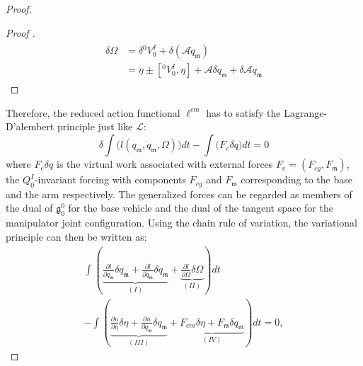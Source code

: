 \documentclass[lettersize,journal]{IEEEtran}
\def \g  {\mathfrak{g}}
\def \m  {\mathfrak{m}}
\def \L {\mathcal{L}}
\def \A {\mathcal{A}}
\theoremstyle{remark}
\begin{document}
\begin{proof}[Proof]
\begin{proof}[Proof ]
\begin{align}
\begin{split}
    \delta \Omega &= \delta {}^0V^I_0+ \delta (\A\dot{q}_\mathfrak{m})\\
    &= \dot{\eta}\pm [{}^0V^I_0,\eta] + \A\delta \dot{q}_\mathfrak{m}+\delta \A\dot{q}_\mathfrak{m}
    \end{split}
\end{align}
\end{proof}
Therefore, the reduced action functional $\ell^{cm}$ has to satisfy the Lagrange-D'alembert principle just like $\L$:
\begin{equation}
    \delta \int \Big(l(q_\mathfrak{m},\dot{q}_\mathfrak{m},\Omega)\Big)dt- \int \Big( F_e\delta q \Big) dt=0
\end{equation}
where $F_e\delta q$ is the virtual work associated with external forces $F_e=(F_{cg},F_\mathfrak{m})$, the $Q^I_0$-invariant forcing with components $F_{cg}$ and $F_\mathfrak{m}$ corresponding to the base and the arm respectively. The generalized forces can be regarded as members of the dual of $\g^0_0$ for the base vehicle and the dual of the tangent space for the manipulator joint configuration.%
Using the chain rule of variation, the variational principle can then be written as:
\begin{multline}
    \int (\underbrace{\frac{\partial l}{\partial q_\mathfrak{m}} \delta q_\mathfrak{m} +\frac{\partial l}{\partial\dot{q}_\mathfrak{m}} \delta \dot{q}_\mathfrak{m}}_{(I)} +\underbrace{\frac{\partial l}{\partial\Omega} \delta \Omega}_{(II)})dt\\
        -\int (\underbrace{\frac{\partial u}{\partial \eta} \delta \eta+\frac{\partial u}{\partial q_\m} \delta q_\m}_{(III)} +\underbrace{F_{cm}\delta \eta +F_{\m}\delta q_\m}_{(IV)})dt=0, %
        \label{variationequation}
\end{multline}



\end{proof}
\end{document}
